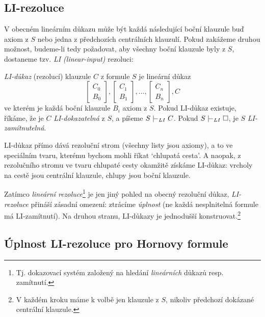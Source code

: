 \subsection{LI-rezoluce}

V obecném lineárním důkazu může být každá následující boční klauzule buď axiom z $S$ nebo jedna z předchozích centrálních klauzulí. Pokud zakážeme druhou možnost, budeme-li tedy požadovat, aby všechny boční klauzule byly z $S$, dostaneme tzv. \emph{LI (linear-input)} rezoluci:
    
\begin{definition}[LI-důkaz]
    \emph{LI-důkaz} (rezolucí) klauzule $C$ z formule $S$ je lineární důkaz 
    $$
    \begin{bmatrix}
        C_0 \\
        B_0
    \end{bmatrix},
    \begin{bmatrix}
        C_1 \\
        B_1
    \end{bmatrix},\dots,
    \begin{bmatrix}
        C_n \\
        B_n
    \end{bmatrix},
    C
    $$
    ve kterém je každá boční klauzule $B_i$ axiom z $S$. Pokud LI-důkaz existuje, říkáme, že je $C$ \emph{LI-dokazatelná} z $S$, a píšeme $S\proves_{LI}C$. Pokud $S\proves_{LI}\square$, je $S$ \emph{LI-zamítnutelná}.
\end{definition}

\begin{remark}
    LI-důkaz přímo dává rezoluční strom (všechny listy jsou axiomy), a to ve speciálním tvaru, kterému bychom mohli říkat `chlupatá cesta'. A naopak, z rezolučního stromu ve tvaru chlupaté cesty okamžitě získáme LI-důkaz: vrcholy na cestě jsou centrální klauzule, chlupy jsou boční klauzule.
\end{remark}

Zatímco \emph{lineární rezoluce}\footnote{Tj. dokazovací systém založený na hledání \emph{lineárních} důkazů resp. zamítnutí.} je jen jiný pohled na obecný rezoluční důkaz, \emph{LI-rezoluce} přináší zásadní omezení: ztrácíme \emph{úplnost} (ne každá nesplnitelná formule má LI-zamítnutí). Na druhou stranu, LI-důkazy je jednodušší konstruovat.\footnote{V každém kroku máme k volbě jen klauzule z $S$, nikoliv předchozí dokázané centrální klauzule.} 

\subsection{Úplnost LI-rezoluce pro Hornovy formule}

